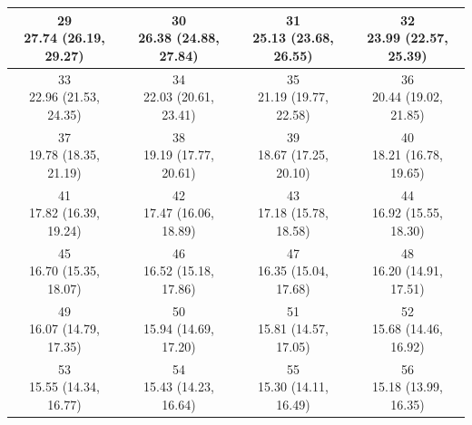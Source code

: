\begin{table}[htbp]
\begin{tabular}{cccc}
\hline
\shortstack[c]{29\\27.74 (26.19, 29.27)} & \shortstack[c]{30\\26.38 (24.88, 27.84)} & \shortstack[c]{31\\25.13 (23.68, 26.55)} & \shortstack[c]{32\\23.99 (22.57, 25.39)} \\
\hline
\shortstack[c]{33\\22.96 (21.53, 24.35)} & \shortstack[c]{34\\22.03 (20.61, 23.41)} & \shortstack[c]{35\\21.19 (19.77, 22.58)} & \shortstack[c]{36\\20.44 (19.02, 21.85)} \\
\hline
\shortstack[c]{37\\19.78 (18.35, 21.19)} & \shortstack[c]{38\\19.19 (17.77, 20.61)} & \shortstack[c]{39\\18.67 (17.25, 20.10)} & \shortstack[c]{40\\18.21 (16.78, 19.65)} \\
\hline
\shortstack[c]{41\\17.82 (16.39, 19.24)} & \shortstack[c]{42\\17.47 (16.06, 18.89)} & \shortstack[c]{43\\17.18 (15.78, 18.58)} & \shortstack[c]{44\\16.92 (15.55, 18.30)} \\
\hline
\shortstack[c]{45\\16.70 (15.35, 18.07)} & \shortstack[c]{46\\16.52 (15.18, 17.86)} & \shortstack[c]{47\\16.35 (15.04, 17.68)} & \shortstack[c]{48\\16.20 (14.91, 17.51)} \\
\hline
\shortstack[c]{49\\16.07 (14.79, 17.35)} & \shortstack[c]{50\\15.94 (14.69, 17.20)} & \shortstack[c]{51\\15.81 (14.57, 17.05)} & \shortstack[c]{52\\15.68 (14.46, 16.92)} \\
\hline
\shortstack[c]{53\\15.55 (14.34, 16.77)} & \shortstack[c]{54\\15.43 (14.23, 16.64)} & \shortstack[c]{55\\15.30 (14.11, 16.49)} & \shortstack[c]{56\\15.18 (13.99, 16.35)} \\

\end{tabular}
\end{table}
